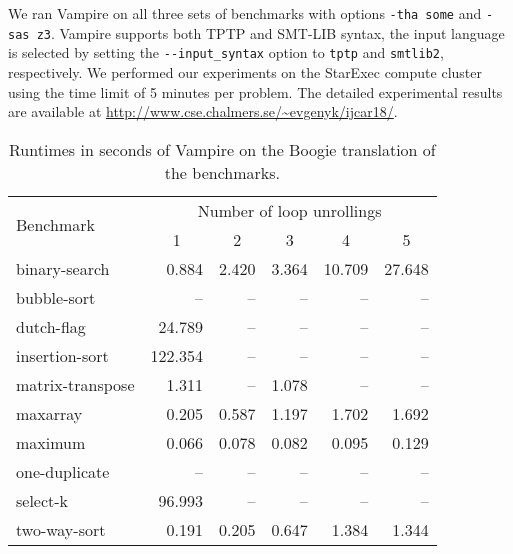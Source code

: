 We ran Vampire on all three sets of benchmarks with options \verb'-tha some' and \verb'-sas z3'. Vampire supports both TPTP and SMT-LIB syntax, the input language is selected by setting the \verb'--input_syntax' option to \verb'tptp' and \verb'smtlib2', respectively. We performed our experiments on the StarExec compute cluster~\cite{starexec} using the time limit of 5 minutes per problem. The detailed experimental results are available at \url{http://www.cse.chalmers.se/~evgenyk/ijcar18/}.

\begin{table}\center
  \caption{Runtimes in seconds of Vampire on the Boogie translation of the benchmarks.}
  \label{table:boogie/boogie-results}
  \begin{tabular}[ht]{lrrrrr}
\hline
\multirow{2}{*}{Benchmark} & \multicolumn{5}{c}{Number of loop unrollings} \\ %
& \multicolumn{1}{c}{1} & \multicolumn{1}{c}{2} & \multicolumn{1}{c}{3} & \multicolumn{1}{c}{4} & \multicolumn{1}{c}{5} \\
\hline
binary-search    & 0.884 & 2.420 & 3.364 & 10.709 & 27.648 \\
bubble-sort      & -- & -- & -- & -- & -- \\
dutch-flag       & 24.789 & -- & -- & -- & -- \\
insertion-sort   & 122.354 & -- & -- & -- & -- \\
matrix-transpose & 1.311 & -- & 1.078 & -- & -- \\
maxarray         & 0.205 & 0.587 & 1.197 & 1.702 & 1.692 \\
maximum          & 0.066 & 0.078 & 0.082 & 0.095 & 0.129 \\
one-duplicate    & -- & -- & -- & -- & -- \\
select-k         & 96.993 & -- & -- & -- & -- \\
two-way-sort     & 0.191 & 0.205 & 0.647 & 1.384 & 1.344 \\
  \end{tabular}
\end{table}

